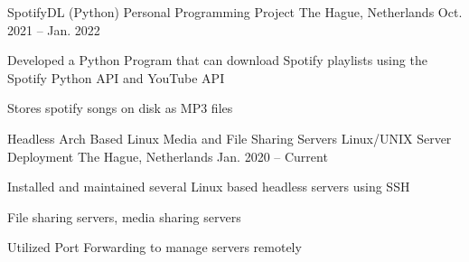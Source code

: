 \begin{cventries}
  \cventry
    {SpotifyDL (Python)} %
    {Personal Programming Project} %
    {The Hague, Netherlands} %
    {Oct. 2021 -- Jan. 2022} %
    {
      \begin{cvitems} %
        \item {Developed a Python Program that can download Spotify playlists using the Spotify Python API and YouTube API}
        \item {Stores spotify songs on disk as MP3 files}
      \end{cvitems}
    }
    \vspace{2mm}
  \cventry
    {Headless Arch Based Linux Media and File Sharing Servers} %
    {Linux/UNIX Server Deployment} %
    {The Hague, Netherlands} %
    {Jan. 2020 -- Current} %
    {
      \begin{cvitems} %
        \item {Installed and maintained several Linux based headless servers using SSH}
        \item {File sharing servers, media sharing servers}
        \item {Utilized Port Forwarding to manage servers remotely}
      \end{cvitems}
      \vspace{4mm}
    }
\end{cventries}
